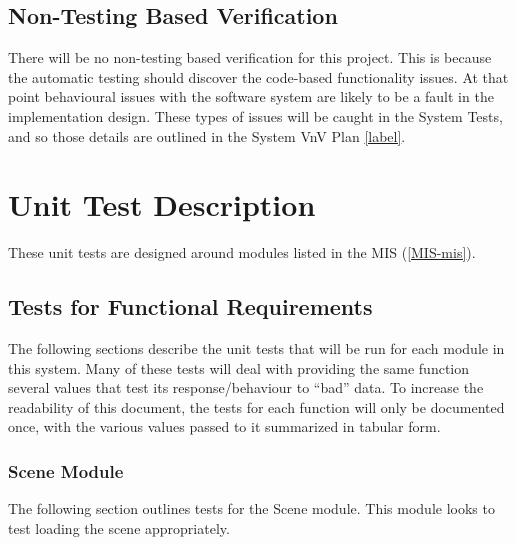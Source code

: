 \documentclass[12pt, titlepage]{article}
\begin{document}
\subsection{Non-Testing Based Verification}
There will be no non-testing based verification for this project. This is 
because the automatic testing should discover the code-based functionality 
issues. At that point behavioural issues with the software system are likely to 
be a fault in the implementation design. These types of issues will be caught 
in the System Tests, and so those details are outlined in the System VnV Plan 
\ref{label}.


\section{Unit Test Description}
These unit tests are designed around modules listed in the MIS (\ref{MIS-mis}).


\subsection{Tests for Functional Requirements}
The following sections describe the unit tests that will be run for each module 
in this system. Many of these tests will deal with providing the same function 
several values that test its response/behaviour to ``bad'' data. To increase 
the readability of this document, the tests for each function will only be 
documented once, with the various values passed to it summarized in tabular 
form.

\subsubsection{Scene Module}
The following section outlines tests for the Scene module. This module looks to 
test loading the scene appropriately.
\end{document}
